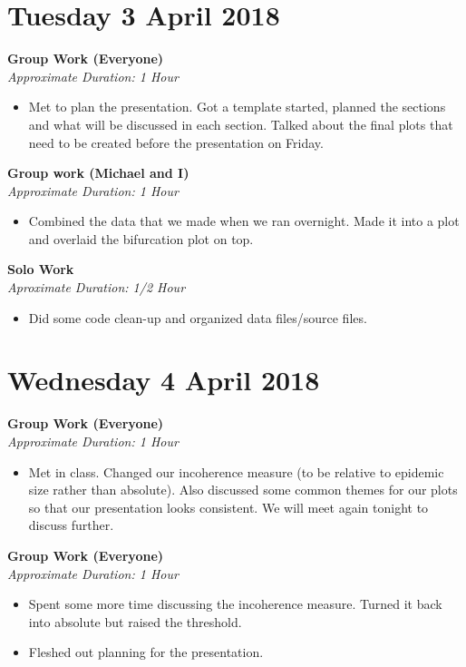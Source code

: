 \documentclass[12pt]{article}\usepackage[]{graphicx}\usepackage[]{color}
\begin{document}
\begin{itemize}
\section*{Tuesday 3 April 2018}

\textbf{Group Work (Everyone)} \\
\emph{Approximate Duration: 1 Hour}

\begin{itemize}
\item Met to plan the presentation. Got a template started, planned the sections and what will be discussed in each section. Talked about the final plots that need to be created before the presentation on Friday.
\end{itemize}

\textbf{Group work (Michael and I)}\\
\emph{Approximate Duration: 1 Hour}

\begin{itemize}
\item Combined the data that we made when we ran overnight. Made it into a plot and overlaid the bifurcation plot on top. 
\end{itemize}

\textbf{Solo Work}\\
\emph{Aproximate Duration: 1/2 Hour}

\begin{itemize}
\item Did some code clean-up and organized data files/source files.
\end{itemize}


\section*{Wednesday 4 April 2018}

\textbf{Group Work (Everyone)} \\
\emph{Approximate Duration: 1 Hour}

\begin{itemize}
\item Met in class. Changed our incoherence measure (to be relative to epidemic size rather than absolute). Also discussed some common themes for our plots so that our presentation looks consistent. We will meet again tonight to discuss further.
\end{itemize}

\textbf{Group Work (Everyone)}\\
\emph{Approximate Duration: 1 Hour}
\begin{itemize}
\item Spent some more time discussing the incoherence measure. Turned it back into absolute but raised the threshold.
\item Fleshed out planning for the presentation.
\end{itemize}


\end{itemize}
\end{document}
